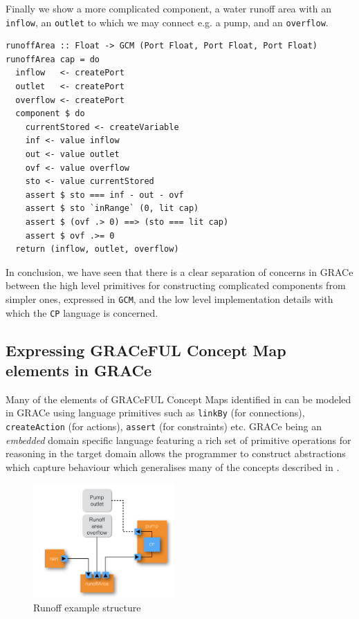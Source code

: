 Finally we show a more complicated component, a water runoff area with
an \texttt{inflow}, an \texttt{outlet} to which we may connect e.g. a pump,
and an \texttt{overflow}.
\begin{verbatim}
runoffArea :: Float -> GCM (Port Float, Port Float, Port Float)
runoffArea cap = do
  inflow   <- createPort
  outlet   <- createPort
  overflow <- createPort
  component $ do
    currentStored <- createVariable
    inf <- value inflow
    out <- value outlet
    ovf <- value overflow
    sto <- value currentStored
    assert $ sto === inf - out - ovf
    assert $ sto `inRange` (0, lit cap)
    assert $ (ovf .> 0) ==> (sto === lit cap)
    assert $ ovf .>= 0
  return (inflow, outlet, overflow)
\end{verbatim}

In conclusion, we have seen that there is a clear separation of concerns in GRACe between
the high level primitives for constructing complicated components from
simpler ones, expressed in \texttt{GCM}, and the low level
implementation details with which the \texttt{CP} language is
concerned.

\subsection{Expressing GRACeFUL Concept Map elements in GRACe}
Many of the elements of GRACeFUL Concept Maps identified in
\cite{D4.1} can be modeled in GRACe using language primitives such as
\texttt{linkBy} (for connections), \texttt{createAction} (for
actions), \texttt{assert} (for constraints) etc.
GRACe being an \textit{embedded} domain specific language featuring a
rich set of primitive operations for reasoning in the target domain
allows the programmer to construct abstractions which capture
behaviour which generalises many of the concepts described in
\cite{D4.1}.
%
\begin{figure}
  \centering
\includegraphics[width=0.48\textwidth]{fig/RunoffExample.png}
  \caption{Runoff example structure}
  \label{fig:RunoffEx}
\end{figure}
%
